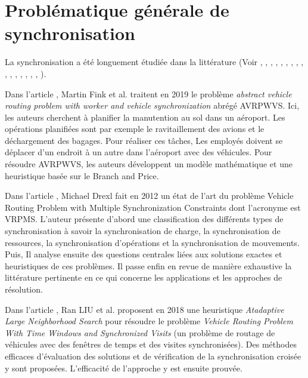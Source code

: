 \section{Problématique générale de synchronisation}

La synchronisation a été longuement étudiée dans la littérature (Voir \cite{article_synchro2}, \cite{article_synchro1}, \cite{article_synchro3}, \cite{IRP_Adulyasak}, \cite{IRP_Alvarez_2019}, \cite{IRP_Alvarez}, \cite{IRP_Archetti_2012}, \cite{IRP_Archetti}, \cite{IRP_Archetti_2017}, \cite{IRP_Chitsaz}, \cite{IRP_Leandro}, \cite{IRP_Coelho_2014}, \cite{IRP_Guy}, \cite{article_GVRP5}, \cite{IRP_Hewitt}, \cite{PRP_Panagiotis_2020}, \cite{IRP_Edcarllos}).

Dans l'article \cite{article_synchro1}, Martin Fink et al. traitent en 2019 le problème \textit{abstract vehicle routing problem with worker and vehicle synchronization} abrégé AVRPWVS. Ici, les auteurs cherchent à planifier la manutention au sol dans un aéroport. Les opérations planifiées sont par exemple le ravitaillement des avions et le déchargement des bagages. Pour réaliser ces tâches, Les employés doivent se déplacer d'un endroit à un autre dans l'aéroport avec des véhicules. Pour résoudre AVRPWVS, les auteurs développent un modèle mathématique et une heuristique basée sur le Branch and Price.

Dans l'article \cite{article_synchro2}, Michael Drexl fait en 2012 un état de l'art du problème Vehicle Routing Problem with Multiple Synchronization Constraints dont l'acronyme est VRPMS. L'auteur présente d'abord une classification des différents types de synchronisation à savoir la synchronisation de charge, la synchronisation de ressources, la synchronisation d'opérations et la synchronisation de mouvements. Puis, Il analyse ensuite des questions centrales liées aux solutions exactes et heuristiques de ces problèmes. Il passe enfin en revue de manière exhaustive la littérature pertinente en ce qui concerne les applications et les approches de résolution.

Dans l'article \cite{article_synchro3}, Ran LIU et al. proposent en 2018 une heuristique \textit{Atadaptive Large Neighborhood Search} pour résoudre le problème \textit{Vehicle Routing Problem With Time Windows and Synchronized Visits}
(un problème de routage de véhicules avec des fenêtres de temps et des visites synchronisées).
Des méthodes efficaces d'évaluation des solutions et de vérification de la synchronisation croisée y sont proposées. L'efficacité de l'approche y est ensuite prouvée.

